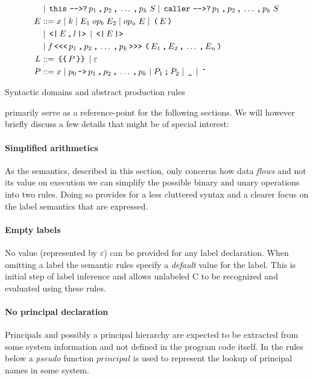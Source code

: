\begin{table}[h]
\begin{align*}
              & \gp \tk{this} \tk{-{}->?} p_1 \tk , p_2 \tk , \dots \tk , p_k \; S \gp \tk{caller} \tk{-{}->?} p_1 \tk , p_2 \tk , \dots \tk , p_k \; S \\
    E         & ::= x \gp k \gp E_1 \; op_b \; E_2 \gp op_u \; E \gp \tk ( E \tk ) \\
              & \gp \tk{<|} E \tk , l \tk{|>} \gp \tk{<|} E \tk{|>} \\
              & \gp f \tk{<{}<{}<} p_1 \tk , p_2 \tk , \dots \tk , p_k \tk{>{}>{}>} \tk ( E_1 \tk , E_2 \tk , \dots \tk , E_n \tk ) \\
    L         & ::= \tk{\{\{} P \tk{\}\}} \gp \varepsilon \\
    P       & ::= x \gp p_0 \tk{->} p_1 \tk , p_2 \tk , \dots \tk , p_k \gp P_1 \tk ; P_2 \gp \tk \_ \gp \tk{\^{}}
  \end{align*}
  \caption{Syntactic domains and abstract production rules}
  \label{ctif:rules}
\end{table}

 primarily serve as a reference-point for the following sections.
We will however briefly discuss a few details that might be of special interest:

\paragraph{Simplified arithmetics}
As the semantics, described in this section, only concerns how data \textit{flows} and not its value on execution we can simplify the possible binary and unary operations into two rules.
Doing so provides for a less cluttered syntax and a clearer focus on the label semantics that are expressed.

\paragraph{Empty labels}
No value (represented by $\varepsilon$) can be provided for any label declaration.
When omitting a label the semantic rules specify a \textit{default} value for the label.
This is initial step of label inference and allows unlabeled C to be recognized and evaluated using these rules.

\paragraph{No principal declaration}
Principals and possibly a principal hierarchy are expected to be extracted from some system information and not defined in the program code itself.
In the rules below a \textit{pseudo} function $principal$ is used to represent the lookup of principal names in some system.

